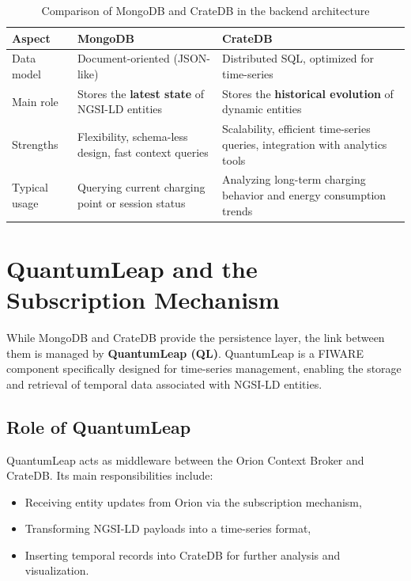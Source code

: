 \begin{table}[ht!]
    \centering
    \caption{Comparison of MongoDB and CrateDB in the backend architecture}
    \label{tab:mongodb-cratedb}
    \begin{tabular}{|p{3cm}|p{5cm}|p{5cm}|}
        \hline
        \textbf{Aspect} & \textbf{MongoDB} & \textbf{CrateDB} \\
        \hline
        Data model & Document-oriented (JSON-like) & Distributed SQL, optimized for time-series \\
        \hline
        Main role & Stores the \textbf{latest state} of NGSI-LD entities & Stores the \textbf{historical evolution} of dynamic entities \\
        \hline
        Strengths & Flexibility, schema-less design, fast context queries & Scalability, efficient time-series queries, integration with analytics tools \\
        \hline
        Typical usage & Querying current charging point or session status & Analyzing long-term charging behavior and energy consumption trends \\
        \hline
    \end{tabular}
\end{table}

\section{QuantumLeap and the Subscription Mechanism}

While MongoDB and CrateDB provide the persistence layer, the link between them is managed by \textbf{QuantumLeap (QL)}. 
QuantumLeap is a FIWARE component specifically designed for time-series management, enabling the storage and retrieval of temporal data associated with NGSI-LD entities.

\subsection*{Role of QuantumLeap}
QuantumLeap acts as middleware between the Orion Context Broker and CrateDB. Its main responsibilities include:
\begin{itemize}
    \item Receiving entity updates from Orion via the subscription mechanism,
    \item Transforming NGSI-LD payloads into a time-series format,
    \item Inserting temporal records into CrateDB for further analysis and visualization.
\end{itemize}

